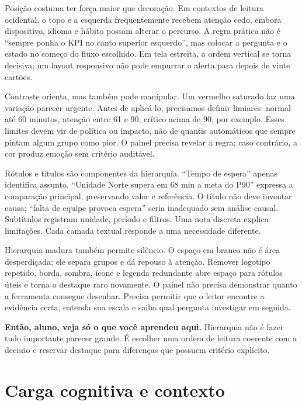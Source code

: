 Posição costuma ter força maior que decoração. Em contextos de leitura ocidental, o topo e a esquerda frequentemente recebem atenção cedo, embora dispositivo, idioma e hábito possam alterar o percurso. A regra prática não é ``sempre ponha o KPI no canto superior esquerdo'', mas colocar a pergunta e o estado no começo do fluxo escolhido. Em tela estreita, a ordem vertical se torna decisiva; um layout responsivo não pode empurrar o alerta para depois de vinte cartões.

Contraste orienta, mas também pode manipular. Um vermelho saturado faz uma variação parecer urgente. Antes de aplicá-lo, precisamos definir limiares: normal até 60 minutos, atenção entre 61 e 90, crítico acima de 90, por exemplo. Esses limites devem vir de política ou impacto, não de quantis automáticos que sempre pintam algum grupo como pior. O painel precisa revelar a regra; caso contrário, a cor produz emoção sem critério auditável.

Rótulos e títulos são componentes da hierarquia. ``Tempo de espera'' apenas identifica assunto. ``Unidade Norte supera em 68 min a meta do P90'' expressa a comparação principal, preservando valor e referência. O título não deve inventar causa; ``falta de equipe provoca espera'' seria inadequado sem análise causal. Subtítulos registram unidade, período e filtros. Uma nota discreta explica limitações. Cada camada textual responde a uma necessidade diferente.

Hierarquia madura também permite silêncio. O espaço em branco não é área desperdiçada; ele separa grupos e dá repouso à atenção. Remover logotipo repetido, borda, sombra, ícone e legenda redundante abre espaço para rótulos úteis e torna o destaque raro novamente. O painel não precisa demonstrar quanto a ferramenta consegue desenhar. Precisa permitir que o leitor encontre a evidência certa, entenda sua escala e saiba qual pergunta investigar em seguida.

\begin{SummaryBox}
\textbf{Então, aluno, veja só o que você aprendeu aqui.} Hierarquia não é fazer tudo importante parecer grande. É escolher uma ordem de leitura coerente com a decisão e reservar destaque para diferenças que possuem critério explícito.
\end{SummaryBox}

\section{Carga cognitiva e contexto}

